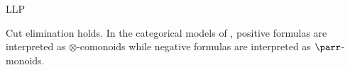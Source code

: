 \begin{entry}{LLP}
\begin{technicalities}
Cut elimination holds.
In the categorical models of \LLP, positive formulas are interpreted as $\otimes$-comonoids while negative formulas are interpreted as $\parr$-monoids.
\end{technicalities}



%
%
%
%
%
%
% 
%












\end{entry}



